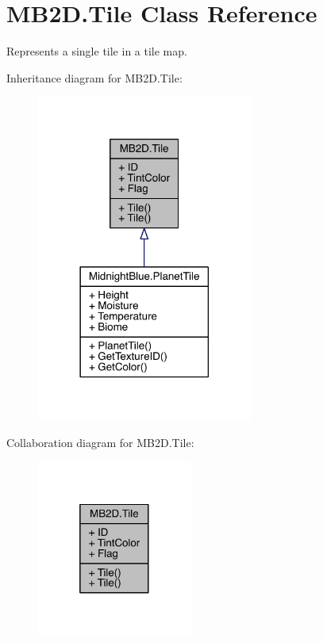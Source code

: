 \hypertarget{class_m_b2_d_1_1_tile}{}\section{M\+B2\+D.\+Tile Class Reference}
\label{class_m_b2_d_1_1_tile}


Represents a single tile in a tile map.  




Inheritance diagram for M\+B2\+D.\+Tile\+:\nopagebreak
\begin{figure}[H]
\begin{center}
\leavevmode
\includegraphics[width=201pt]{class_m_b2_d_1_1_tile__inherit__graph}
\end{center}
\end{figure}


Collaboration diagram for M\+B2\+D.\+Tile\+:\nopagebreak
\begin{figure}[H]
\begin{center}
\leavevmode
\includegraphics[width=145pt]{class_m_b2_d_1_1_tile__coll__graph}
\end{center}
\end{figure}

